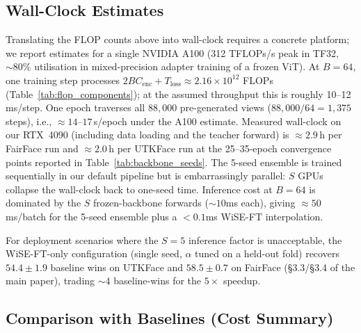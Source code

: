 \subsection{Wall-Clock Estimates}

Translating the FLOP counts above into wall-clock requires a concrete platform; we report estimates for a single NVIDIA A100 (312 TFLOPs/s peak in TF32, ${\sim}80\%$ utilisation in mixed-precision adapter training of a frozen ViT).
At $B{=}64$, one training step processes $2BC_{\text{enc}}+T_{\text{loss}}\approx 2.16{\times}10^{12}$ FLOPs (Table~\ref{tab:flop_components}); at the assumed throughput this is roughly 10--12\,ms/step.
One epoch traverses all $88{,}000$ pre-generated views ($88{,}000/64 = 1{,}375$ steps), i.e., ${\approx}14$--$17$\,s/epoch under the A100 estimate.
Measured wall-clock on our RTX~4090 (including data loading and the teacher forward) is ${\approx}2.9$\,h per FairFace run and ${\approx}2.0$\,h per UTKFace run at the 25--35-epoch convergence points reported in Table~\ref{tab:backbone_seeds}.
The 5-seed ensemble is trained sequentially in our default pipeline but is embarrassingly parallel: $S$ GPUs collapse the wall-clock back to one-seed time.
Inference cost at $B{=}64$ is dominated by the $S$ frozen-backbone forwards (${\sim}10$ms each), giving ${\approx}50$ms/batch for the 5-seed ensemble plus a ${<}0.1$ms WiSE-FT interpolation.

For deployment scenarios where the $S{=}5$ inference factor is unacceptable, the WiSE-FT-only configuration (single seed, $\alpha$ tuned on a held-out fold) recovers $54.4{\pm}1.9$ baseline wins on UTKFace and $58.5{\pm}0.7$ on FairFace (\S3.3/\S3.4 of the main paper), trading ${\sim}4$ baseline-wins for the $5{\times}$ speedup.

\subsection{Comparison with Baselines (Cost Summary)}

